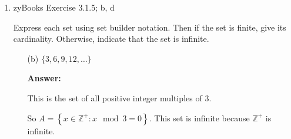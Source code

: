 \documentclass[14pt]{extreport}
\newcommand{\answer}[0]{\medskip \textbf{Answer:} \medskip}
\begin{document}
\begin{enumerate}
\begin{enumerate}
            \item[(a)] \( 15 \subset A \)
            
                \answer

                False. \( 15 \in A \), but it is an element so it cannot be a subset of another set.

            \item[(b)] \( \{15\} \subset A \)
            
                \answer

                True, since every element of the set (15) is in \( A \), and \( {15} \neq A \).

            \item[(c)] \( \emptyset \subset A \)
            
                \answer

                True, since the empty set is a subset of every set.

            \item[(d)] \( A \subseteq A \)
            
                \answer

                True, since every element of \( A \) is in \( A \).

            \item[(e)] \( \emptyset \in B \)
            
                \answer

                False, no element of \( B \) is a set.

        \end{enumerate}

    \item zyBooks Exercise 3.1.5; b, d
    
    Express each set using set builder notation. Then if the set is finite, give its cardinality. Otherwise, indicate that the set is infinite.
    
        \begin{enumerate}

            \item[(b)] \( \{ 3, 6, 9, 12, \dots \} \)
            
                \answer

                This is the set of all positive integer multiples of 3. 
                
                So \( A = \left\{ x \in \mathbb{Z}^{+}: x \mod 3 = 0 \right\} \). This set is infinite because \( \mathbb{Z}^+ \) is infinite.
            

\end{enumerate}
\end{enumerate}
\end{document}
